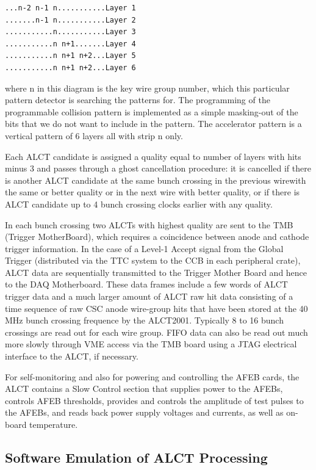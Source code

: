 \begin{center}
\begin{verbatim}
...n-2 n-1 n...........Layer 1
.......n-1 n...........Layer 2
...........n...........Layer 3
...........n n+1.......Layer 4
...........n n+1 n+2...Layer 5
...........n n+1 n+2...Layer 6
\end{verbatim}
\end{center}

where n in this diagram is the key wire group number, which this particular pattern detector is searching the patterns for. The programming of the programmable collision pattern is implemented as a simple masking-out of the bits that we do not want to include in the pattern. The accelerator pattern is a vertical pattern of 6 layers all with strip n only.

Each ALCT candidate is assigned a quality equal to number of layers with hits minus 3 and passes through a ghost cancellation procedure: it is cancelled if there is another ALCT candidate at the same bunch crossing in the previous wirewith the same or better quality or in the next wire with better quality, or if there is ALCT candidate up to 4 bunch crossing clocks earlier with any quality.

In each bunch crossing two ALCTs with highest quality are sent to the TMB (Trigger MotherBoard), which requires a coincidence between anode and cathode trigger information. In the case of a Level-1 Accept signal from the Global Trigger (distributed via the TTC system to the CCB in each peripheral crate), ALCT data are sequentially transmitted to the Trigger Mother Board and hence to the DAQ Motherboard. These data frames include a few words of ALCT trigger data and a much larger amount of ALCT raw hit data consisting of a time sequence of raw CSC anode wire-group hits that have been stored at the 40 MHz bunch crossing frequence by the ALCT2001. Typically 8 to 16 bunch crossings are read out for each wire group. FIFO data can also be read out much more slowly through VME access via the TMB board using a JTAG electrical interface to the ALCT, if necessary.

For self-monitoring and also for powering and controlling the AFEB cards, the ALCT contains a Slow Control section that supplies power to the AFEBs, controls AFEB thresholds, provides and controls the amplitude of test pulses to the AFEBs, and reads back power supply voltages and currents, as well as on-board temperature. 

\newpage
\subsection{Software Emulation of ALCT Processing}

